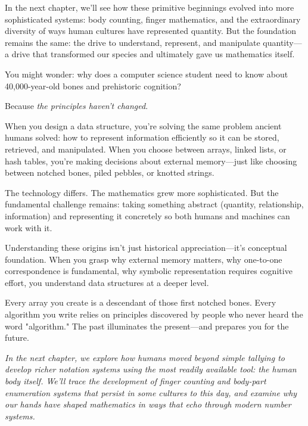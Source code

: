 In the next chapter, we'll see how these primitive beginnings evolved into more sophisticated systems: body counting, finger mathematics, and the extraordinary diversity of ways human cultures have represented quantity. But the foundation remains the same: the drive to understand, represent, and manipulate quantity—a drive that transformed our species and ultimately gave us mathematics itself.

\begin{motivation}
	You might wonder: why does a computer science student need to know about 40,000-year-old bones and prehistoric cognition?
	
	Because \textit{the principles haven't changed}.
	
	When you design a data structure, you're solving the same problem ancient humans solved: how to represent information efficiently so it can be stored, retrieved, and manipulated. When you choose between arrays, linked lists, or hash tables, you're making decisions about external memory—just like choosing between notched bones, piled pebbles, or knotted strings.
	
	The technology differs. The mathematics grew more sophisticated. But the fundamental challenge remains: taking something abstract (quantity, relationship, information) and representing it concretely so both humans and machines can work with it.
	
	Understanding these origins isn't just historical appreciation—it's conceptual foundation. When you grasp why external memory matters, why one-to-one correspondence is fundamental, why symbolic representation requires cognitive effort, you understand data structures at a deeper level.
	
	Every array you create is a descendant of those first notched bones. Every algorithm you write relies on principles discovered by people who never heard the word "algorithm." The past illuminates the present—and prepares you for the future.
\end{motivation}

\begin{center}
	\decorativeseparator
\end{center}

\textit{In the next chapter, we explore how humans moved beyond simple tallying to develop richer notation systems using the most readily available tool: the human body itself. We'll trace the development of finger counting and body-part enumeration systems that persist in some cultures to this day, and examine why our hands have shaped mathematics in ways that echo through modern number systems.}
